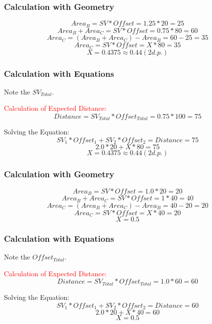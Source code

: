 

\subsubsection{Calculation with Geometry}

\[ Area_B = SV * Offset = 1.25 * 20 = 25 \]
\[ Area_B + Area_C = SV * Offset = 0.75 * 80 = 60 \]
\[ Area_C = (Area_B + Area_C) - Area_B = 60 - 25 = 35 \]
\[ Area_C = SV * Offset = X * 80 = 35 \]
\[ X = 0.4375 \approx 0.44 (2d.p.) \]

\subsubsection{Calculation with Equations}

Note the $SV_{Total}$.

\textcolor{red}{Calculation of Expected Distance:}
\[ Distance = SV_{Total} * Offset_{Total} = 0.75 * 100 = 75 \]

Solving the Equation:
\[ SV_1 * Offset_1 + SV_2 * Offset_2 = Distance = 75\]
\[ 2.0 * 20 + X * 80 = 75\]
\[ X = 0.4375 \approx 0.44 (2d.p.)\]
\newpage





\subsubsection{Calculation with Geometry}

\[ Area_B = SV * Offset = 1.0 * 20 = 20 \]
\[ Area_B + Area_C = SV * Offset = 1 * 40 = 40 \]
\[ Area_C = (Area_B + Area_C) - Area_B = 40 - 20 = 20 \]
\[ Area_C = SV * Offset = X * 40 = 20 \]
\[ X = 0.5 \]

\subsubsection{Calculation with Equations}

Note the $Offset_{Total}$.

\textcolor{red}{Calculation of Expected Distance:}
\[ Distance = SV_{Total} * Offset_{Total} = 1.0 * 60 = 60 \]

Solving the Equation:
\[ SV_1 * Offset_1 + SV_2 * Offset_2 = Distance = 60\]
\[ 2.0 * 20 + X * 40 = 60\]
\[ X = 0.5\]
\newpage